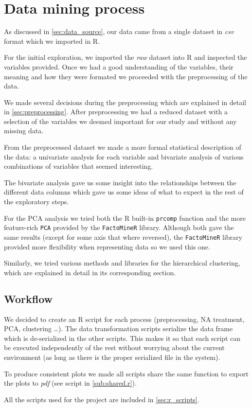 

\section{Data mining process}%
\label{sec:data_mining_process}

As discussed in \cref{sec:data_source}, our data came from a single dataset
in \emph{csv} format which we imported in R.

For the initial exploration, we imported the \emph{raw} dataset into R and
inspected the variables provided. Once we had a good understanding of the
variables, their meaning and how they were formated we proceeded with the
preprocessing of the data.

We made several decisions during the preprocessing which are explained in detail
in \cref{sec:preprocessing}. After preprocessing we had a reduced dataset with
a selection of the variables we deemed important for our study and without
any missing data.

From the preprocessed dataset we made a more formal statistical description of
the data: a univariate analysis for each variable and bivariate analysis of
various combinations of variables that seemed interesting.


The bivariate analysis gave us some insight into the relationships between the
different data columns which gave us some ideas of what to expect in the rest of
the exploratory steps.

For the PCA analysis we tried both the R built-in \texttt{prcomp} function and
the more feature-rich \texttt{PCA} provided by the \texttt{FactoMineR} library.
Although both gave the same results (except for some axis that where reversed),
the \texttt{FactoMineR} library provided more flexibility when representing data
so we used this one.

Similarly, we tried various methods and libraries for the hierarchical
clustering, which are explained in detail in its corresponding section.

\subsection{Workflow}%
\label{sub:workflow}

We decided to create an R script for each process (preprocessing, NA treatment,
PCA, clustering \dots). The data transformation scripts serialize the data frame
which is de-serialized in the other scripts. This makes it so that each script
can be executed independently of the rest without worrying about the current
environment (as long as there is the proper serialized file in the system).

To produce consistent plots we made all scripts share the same function to
export the plots to \emph{pdf} (see script in \cref{sub:shared.r}).

All the scripts used for the project are included in \cref{sec:r_scripts}.
